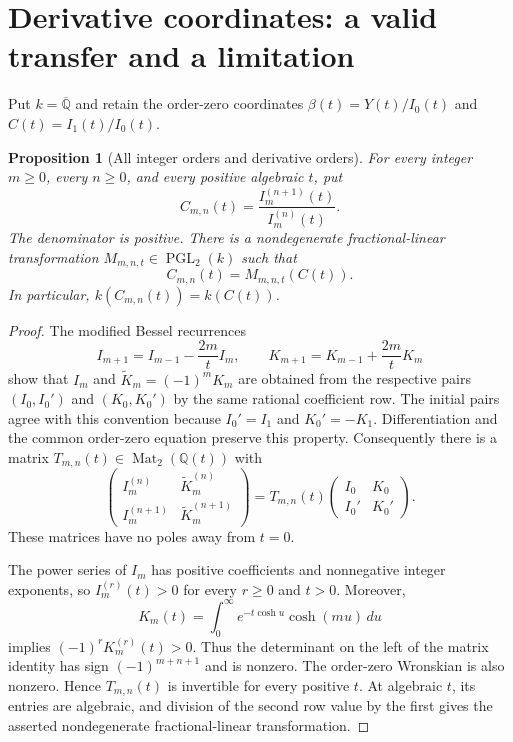 \documentclass[11pt,a4paper]{article}
\newtheorem{proposition}[theorem]{Proposition}
\theoremstyle{definition}\newtheorem{definition}[theorem]{Definition}
\theoremstyle{remark}\newtheorem{remark}[theorem]{Remark}
\begin{document}
\section{Derivative coordinates: a valid transfer and a limitation}

Put $k=\overline{\mathbb Q}$ and retain the order-zero coordinates
$\beta(t)=Y(t)/I_0(t)$ and $C(t)=I_1(t)/I_0(t)$.

\begin{proposition}[All integer orders and derivative orders]
For every integer $m\ge0$, every $n\ge0$, and every positive algebraic
$t$, put
\[
 C_{m,n}(t)=\frac{I_m^{(n+1)}(t)}{I_m^{(n)}(t)}.
\]
The denominator is positive. There is a nondegenerate fractional-linear
transformation $M_{m,n,t}\in\operatorname{PGL}_2(k)$ such that
\[
 C_{m,n}(t)=M_{m,n,t}(C(t)).
\]
In particular, $k(C_{m,n}(t))=k(C(t))$.
\end{proposition}

\begin{proof}
The modified Bessel recurrences
\[
 I_{m+1}=I_{m-1}-\frac{2m}{t}I_m,\qquad
 K_{m+1}=K_{m-1}+\frac{2m}{t}K_m
\]
show that $I_m$ and $\widetilde K_m=(-1)^mK_m$ are obtained from
the respective pairs $(I_0,I_0')$ and $(K_0,K_0')$ by the same
rational coefficient row. The initial pairs agree with this convention
because $I_0'=I_1$ and $K_0'=-K_1$. Differentiation and the common
order-zero equation preserve this property. Consequently there is a
matrix $T_{m,n}(t)\in\operatorname{Mat}_2(\mathbb Q(t))$ with
\[
 \begin{pmatrix}I_m^{(n)}&\widetilde K_m^{(n)}\\
 I_m^{(n+1)}&\widetilde K_m^{(n+1)}\end{pmatrix}
 =T_{m,n}(t)
 \begin{pmatrix}I_0&K_0\\I_0'&K_0'\end{pmatrix}.
\]
These matrices have no poles away from $t=0$.

The power series of $I_m$ has positive coefficients and nonnegative
integer exponents, so $I_m^{(r)}(t)>0$ for every $r\ge0$ and $t>0$.
Moreover,
\[
 K_m(t)=\int_0^\infty e^{-t\cosh u}\cosh(mu)\,du
\]
implies $(-1)^rK_m^{(r)}(t)>0$. Thus the determinant on the left
of the matrix identity has sign $(-1)^{m+n+1}$ and is nonzero.
The order-zero Wronskian is also nonzero. Hence $T_{m,n}(t)$ is
invertible for every positive $t$. At algebraic $t$, its entries are
algebraic, and division of the second row value by the first gives
the asserted nondegenerate fractional-linear transformation.
\end{proof}
\end{document}
